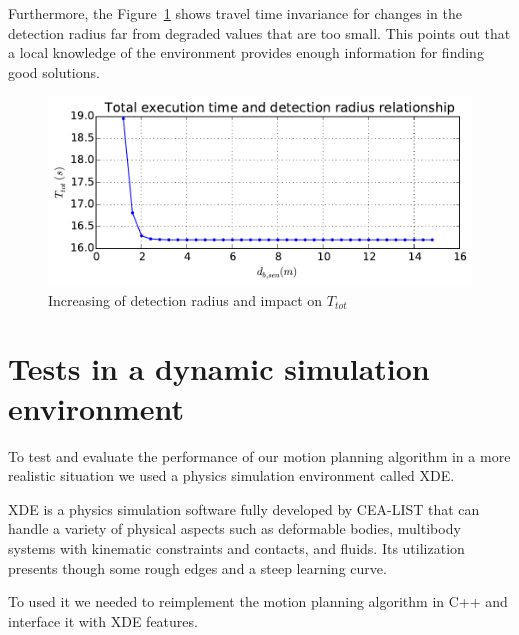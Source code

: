 Furthermore, the Figure~\ref{fig:drhotot} shows travel time
invariance for changes in the detection radius far from degraded values that are too small.
This points out that a local knowledge of the environment provides enough information for finding good solutions.
\begin{figure}[H]\centering
  \includegraphics[width=.65\linewidth]{./images/drho/drho-tot.pdf}
  \caption{Increasing of detection radius and impact on
  $T_{tot}$\label{fig:drhotot}}
\end{figure}



\section{Tests in a dynamic simulation environment}

To test and evaluate the performance of our motion planning algorithm in a more realistic situation we used a physics simulation environment called XDE. 

XDE is a physics simulation software fully developed by CEA-LIST that can handle a variety of physical aspects such as deformable bodies, multibody systems with kinematic constraints and contacts, and fluids. Its utilization presents though some rough edges and a steep learning curve.

To used it we needed to reimplement the motion planning algorithm in C++ and interface it with XDE features.



